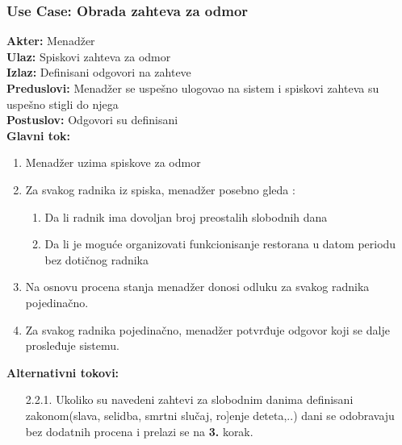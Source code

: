 \documentclass{article}
\begin{document}
\subsubsection{\textbf{Use Case}: Obrada zahteva za odmor}
\textbf{Akter:} Menadžer\\
\textbf{Ulaz:} Spiskovi zahteva za odmor\\
\textbf{Izlaz:} Definisani odgovori na zahteve\\
\textbf{Preduslovi:} Menadžer se uspešno ulogovao na sistem i spiskovi zahteva su uspešno stigli do njega\\
\textbf{Postuslov:} Odgovori su definisani\\
\textbf{Glavni tok:}
\begin{enumerate}
\item Menadžer uzima spiskove za odmor
\item Za svakog radnika iz spiska, menadžer posebno gleda :
\begin{enumerate}[1.]
\item Da li radnik ima dovoljan broj preostalih slobodnih dana 
\item Da li je moguće organizovati funkcionisanje restorana u datom periodu bez dotičnog radnika
\end{enumerate}
\item Na osnovu procena stanja menadžer donosi odluku za svakog radnika pojedinačno.
\item Za svakog radnika pojedinačno, menadžer potvrđuje odgovor koji se dalje prosleđuje sistemu.
\end{enumerate}
\textbf{Alternativni tokovi:}\\
\begin{itemize}
\item[2.2.1.] Ukoliko su navedeni zahtevi za slobodnim danima definisani zakonom(slava, selidba, smrtni slučaj, ro]enje deteta,..) dani se odobravaju bez dodatnih procena i prelazi se na \textbf{3.} korak.
\end{itemize}
\end{document}
